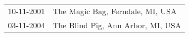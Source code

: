 \begin{supertabular}{ll}
 10-11-2001 &   The Magic Bag, Ferndale, MI, USA \\
 03-11-2004 &  The Blind Pig, Ann Arbor, MI, USA \\
\end{supertabular}
